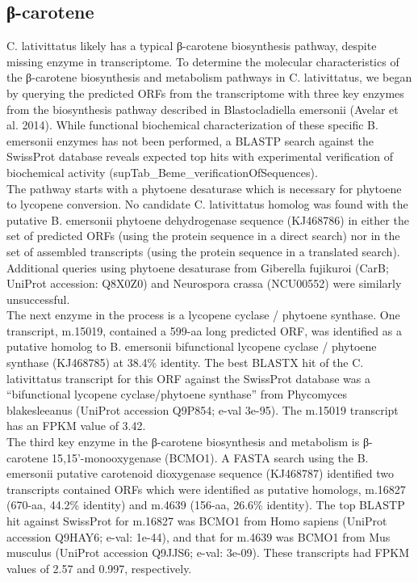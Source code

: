 \subsection{β-carotene} 
C. lativittatus likely has a typical β-carotene biosynthesis pathway, despite missing enzyme in transcriptome. To determine the molecular characteristics of the β-carotene biosynthesis and metabolism pathways in C. lativittatus, we began by querying the predicted ORFs from the transcriptome with three key enzymes from the biosynthesis pathway described in Blastocladiella emersonii (Avelar et al. 2014). While functional biochemical characterization of these specific B. emersonii enzymes has not been performed, a BLASTP search against the SwissProt database reveals expected top hits with experimental verification of biochemical activity (supTab\_Beme\_verificationOfSequences). \\
\indent The pathway starts with a phytoene desaturase which is necessary for phytoene to lycopene conversion. No candidate C. lativittatus homolog was found with the putative B. emersonii phytoene dehydrogenase sequence (KJ468786) in either the set of predicted ORFs (using the protein sequence in a direct search) nor in the set of assembled transcripts (using the protein sequence in a translated search). Additional queries using phytoene desaturase from Giberella fujikuroi (CarB; UniProt accession: Q8X0Z0) and Neurospora crassa (NCU00552) were similarly unsuccessful. \\
\indent The next enzyme in the process is a lycopene cyclase / phytoene synthase. One transcript, m.15019, contained a 599-aa long predicted ORF, was identified as a putative homolog to B. emersonii bifunctional lycopene cyclase / phytoene synthase (KJ468785) at 38.4\% identity. The best BLASTX hit of the C. lativittatus transcript for this ORF against the SwissProt database was a “bifunctional lycopene cyclase/phytoene synthase” from Phycomyces blakesleeanus (UniProt accession Q9P854; e-val 3e-95). The m.15019 transcript has an FPKM value of 3.42. \\
\indent The third key enzyme in the β-carotene biosynthesis and metabolism is β-carotene 15,15’-monooxygenase (BCMO1). A FASTA search using the B. emersonii putative carotenoid dioxygenase sequence (KJ468787) identified two transcripts contained ORFs which were identified as putative homologs, m.16827 (670-aa, 44.2\% identity) and m.4639 (156-aa, 26.6\% identity). The top BLASTP hit against SwissProt for m.16827 was BCMO1 from Homo sapiens (UniProt accession Q9HAY6; e-val: 1e-44), and that for m.4639 was BCMO1 from Mus musculus (UniProt accession Q9JJS6; e-val: 3e-09). These transcripts had FPKM values of 2.57 and 0.997, respectively. \\
